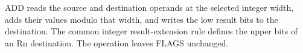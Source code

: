 ADD reads the source and destination operands at the selected integer width,
adds their values modulo that width, and writes the low result bits to the
destination. The common integer result-extension rule defines the upper bits of
an Rn destination. The operation leaves FLAGS unchanged.
